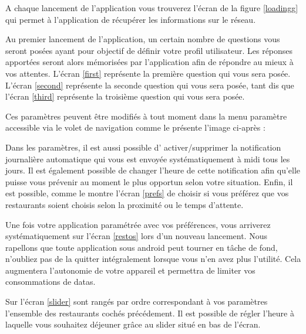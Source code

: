 A chaque lancement de l'application vous trouverez l'écran de la figure \ref{loadingg} qui 
permet à l'application de récupérer les informations sur le réseau.

Au premier lancement de l’application, un certain nombre de questions vous
seront posées ayant pour objectif de définir votre profil utilisateur. Les 
réponses apportées seront alors mémorisées par l’application afin de
répondre au mieux à vos attentes. L'écran \ref{first} représente la première question
qui vous sera posée. L'écran \ref{second} représente la seconde question qui vous 
sera posée, tant dis que l'écran \ref{third} représente la troisième question qui vous
sera posée. 

Ces paramètres peuvent être modifiés à tout moment dans la menu paramètre
accessible via le volet de navigation comme le présente l’image ci-après : 

Dans les paramètres, il est aussi possible d' activer/supprimer la notification
journalière automatique qui vous est envoyée systématiquement à midi tous les jours.
Il est également possible de changer l’heure de cette notification afin qu’elle 
puisse vous prévenir au moment le plus opportun selon votre situation. 
Enfin, il est possible, comme le montre l'écran \ref{prefs} de choisir si vous 
préférez que vos restaurants soient choisis selon la proximité ou le temps 
d'attente.

Une fois votre application paramétrée avec vos préférences, vous arriverez
systématiquement sur l'écran \ref{restos} lors d’un nouveau lancement. Nous
rapellons que toute application sous android peut tourner en tâche de fond,
n’oubliez pas de la quitter intégralement lorsque vous n’en avez plus l’utilité.
Cela augmentera l’autonomie de votre appareil et permettra de limiter vos
consommations de datas. 

Sur l'écran \ref{slider} sont rangés par ordre correspondant à vos paramètres l’ensemble des
restaurants cochés précédement. Il est possible de régler l’heure à laquelle
vous souhaitez déjeuner grâce au slider situé en bas de l’écran.
 
